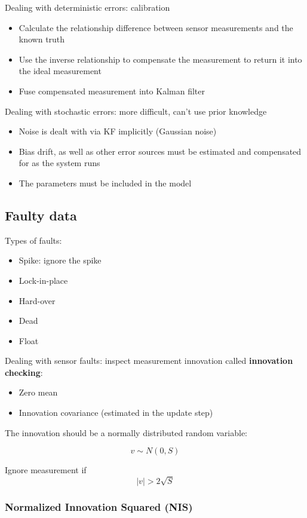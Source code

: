 \documentclass[11pt]{article}
\begin{document}
Dealing with deterministic errors: calibration 
\begin{itemize}
    \item Calculate the relationship difference between sensor measurements and the known truth 
    \item Use the inverse relationship to compensate the measurement to return it into the ideal measurement
    \item Fuse compensated measurement into Kalman filter
\end{itemize}

Dealing with stochastic errors: more difficult, can't use prior knowledge 
\begin{itemize}
    \item Noise is dealt with via KF implicitly (Gaussian noise)
    \item Bias drift, as well as other error sources must be estimated and compensated for as the system runs 
    \item The parameters must be included in the model 
\end{itemize}

\subsection{Faulty data}
Types of faults:
\begin{itemize}
    \item Spike: ignore the spike 
    \item Lock-in-place
    \item Hard-over 
    \item Dead 
    \item Float 
\end{itemize}

Dealing with sensor faults: inspect measurement innovation called \textbf{innovation checking}:

\begin{itemize}
    \item Zero mean 
    \item Innovation covariance (estimated in the update step)
\end{itemize}

The innovation should be a normally distributed random variable:

\[ v \sim N(0,S) \]


Ignore measurement if \[ |v| > 2\sqrt{S} \]


\subsubsection*{Normalized Innovation Squared (NIS)}
\end{document}
